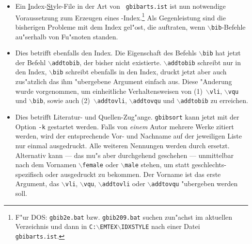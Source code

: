 \documentclass[11pt]{article}                    %
\def\Befehl#1{{\tt$\backslash$#1}}
\begin{document}
  \begin{itemize}

  \item Ein \underline{I}ndex-\underline{St}yle-File in der Art von {\tt
  gbibarts.ist} ist nun notwendige Voraussetzung zum Erzeugen eines
  \bibarts-Index.\footnote{F"ur DOS: {\tt gbib2e.bat} bzw. {\tt gbib209.bat}
  suchen zun"achst im aktuellen Verzeichnis und dann in
  {\tt C:\Befehl{EMTEX}\Befehl{IDXSTYLE}} nach einer Datei {\tt
  gbibarts.ist}.} Als Gegenleistung sind die bisherigen Probleme mit dem
  Index gel"ost, die auftraten, wenn \Befehl{bib}-Befehle au"serhalb von
  Fu"snoten standen.

  \item Dies betrifft ebenfalls den Index. Die Eigenschaft des Befehls
  \Befehl{bib} hat jetzt der Befehl \Befehl{addtobib}, der bisher nicht
  existierte. \Befehl{addtobib} schreibt nur in den Index, \Befehl{bib}
  schreibt ebenfalls in den Index, druckt jetzt aber auch zus"atzlich das
  ihm "ubergebene Argument einfach aus. Diese "Anderung wurde vorgenommen,
  um einheitliche Verhaltensweisen von (1)~\Befehl{vli}, \Befehl{vqu} und
  \Befehl{bib}, sowie auch (2)~\Befehl{addtovli}, \Befehl{addtovqu} und
  \Befehl{addtobib} zu erreichen.

  \item Dies betrifft Literatur- und Quellen-Zug"ange. {\tt gbibsort}
  kann jetzt mit der Option {\tt -k} gestartet werden. Falls von {\it
  einem\/} Autor mehrere Werke zitiert werden, wird der entsprechende Vor-
  und Nachname auf der jeweiligen Liste nur einmal ausgedruckt. Alle weiteren
  Nennungen werden durch \killname{} ersetzt. Alternativ kann --- das mu"s
  aber durchgehend geschehen --- unmittelbar nach dem Vornamen
  \Befehl{female}\addtobib{female@\protect\Befehl{female}} oder
  \Befehl{male}\addtobib{male@\protect\Befehl{male}} stehen, um statt
  \killname{} geschlechts-spezifisch {\tt\femalename} oder {\tt\malename}
  ausgedruckt zu bekommen. Der Vorname ist das erste Argument, das
  \Befehl{vli}, \Befehl{vqu}, \Befehl{addtovli} oder \Befehl{addtovqu}
  "ubergeben werden soll.


\end{itemize}
\end{document}

